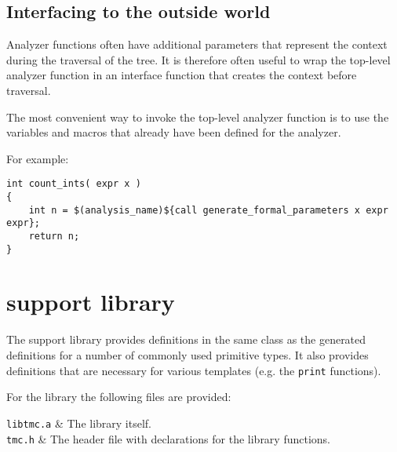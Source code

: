 \subsection{Interfacing to the outside world}
Analyzer functions often have additional parameters that represent
the context during the traversal of the tree. It is therefore often
useful to wrap the top-level analyzer function in an interface function
that creates the context before traversal.
\par
The most convenient way to invoke the top-level analyzer function is to
use the variables and macros that already have been defined for the analyzer.
\par
For example:
\begin{verbatim}
int count_ints( expr x )
{
    int n = $(analysis_name)${call generate_formal_parameters x expr expr};
    return n;
}
\end{verbatim}
\section{{\C} support library}
\label{s.csupportlib}
The {\C} support library provides definitions in
the same class as the generated definitions for a number of commonly used
primitive types.
It also provides definitions that are necessary
for various templates (e.g. the {\tt print} functions).
\par
For the library the following files are provided:

\begin{desctab}
{\tt libtmc.a} & The library itself. \\
{\tt tmc.h} & The header file with declarations for the library functions. \\
\end{desctab}

